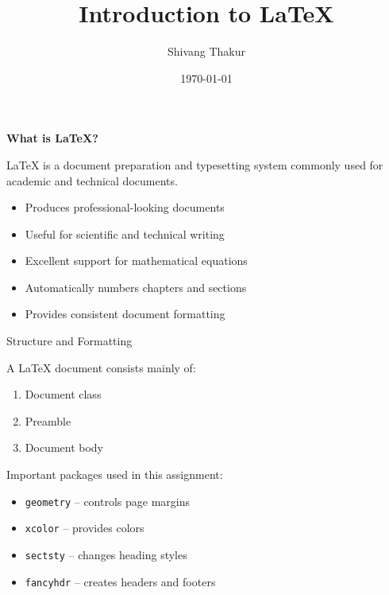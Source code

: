\documentclass{beamer}
\title{\textbf{Introduction to LaTeX}}
\author{Shivang Thakur}
\institute{TW Lab 2025}
\date{\today}
\begin{document}
\begin{frame}
    \titlepage
\end{frame}



\begin{frame}{\textbf{What is LaTeX?}}

\LaTeX{} is a document preparation and typesetting system
commonly used for academic and technical documents.

\begin{itemize}
    \item Produces professional-looking documents
    \item Useful for scientific and technical writing
    \item Excellent support for mathematical equations
    \item Automatically numbers chapters and sections
    \item Provides consistent document formatting
\end{itemize}

\end{frame}



\begin{frame}{Structure and Formatting}

A LaTeX document consists mainly of:

\begin{enumerate}
    \item Document class
    \item Preamble
    \item Document body
\end{enumerate}

\vspace{0.5cm}

Important packages used in this assignment:

\begin{itemize}
    \item \texttt{geometry} -- controls page margins
    \item \texttt{xcolor} -- provides colors
    \item \texttt{sectsty} -- changes heading styles
    \item \texttt{fancyhdr} -- creates headers and footers
\end{itemize}

\end{frame}
\end{document}
